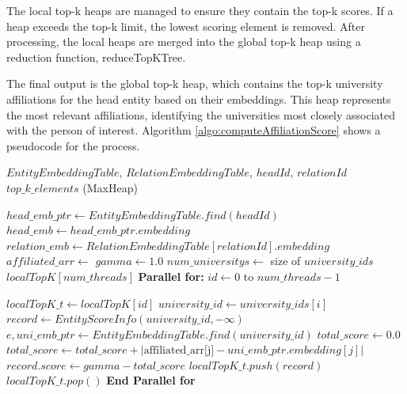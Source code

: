 \documentclass[sigconf]{acmart}
\newcommand{\ParFor}[1]{%
    \textbf{Parallel for:} #1
}
\newcommand{\EndParFor}{%
    \textbf{End Parallel for}
}
\begin{document}
The local top-k heaps are managed to ensure they contain the top-k scores. If a heap exceeds the top-k limit, the lowest scoring element is removed. After processing, the local heaps are merged into the global top-k heap using a reduction function, reduceTopKTree.

The final output is the global top-k heap, which contains the top-k university affiliations for the head entity based on their embeddings. This heap represents the most relevant affiliations, identifying the universities most closely associated with the person of interest. Algorithm \ref{algo:computeAffiliationScore} shows a pseudocode for the process. 

\begin{algorithm*}
\caption{Compute Top-k Affiliations for a Person}
\begin{algorithmic}[1]
\Require $EntityEmbeddingTable$, $RelationEmbeddingTable$, $headId$, $relationId$
\Ensure $top\_k\_elements$ (MaxHeap)

    \State $head\_emb\_ptr \gets EntityEmbeddingTable.find(headId)$
    \State $head\_emb \gets head\_emb\_ptr.embedding$
    \State $relation\_emb \gets RelationEmbeddingTable[relationId].embedding$
    \State $affiliated\_arr \gets$ 
    \State $gamma \gets 1.0$
    \State $num\_universitys \gets$ size of $university\_ids$
    \State $localTopK[num\_threads]$ 
    \ParFor{$id \gets 0$ to $num\_threads - 1$}
        \State $localTopK\_t \gets localTopK[id]$
            \State $university\_id \gets university\_ids[i]$
            \State $record \gets EntityScoreInfo(university\_id, -\infty)$
            \State $e, uni\_emb\_ptr \gets EntityEmbeddingTable.find(university\_id)$
                \State $total\_score \gets 0.0$
                    \State $total\_score \gets total\_score + |\text{affiliated\_arr[j]} - uni\_emb\_ptr.embedding[j]|$
                \EndFor
                \State $record.score \gets gamma - total\_score$
            \EndIf
            \State $localTopK\_t.push(record)$
                \State $localTopK\_t.pop()$
            \EndIf
        \EndFor
        \State {}
    \EndParFor
\EndFunction
\end{algorithmic}
\label {algo:computeAffiliationScore}
\end{algorithm*}
\end{document}

